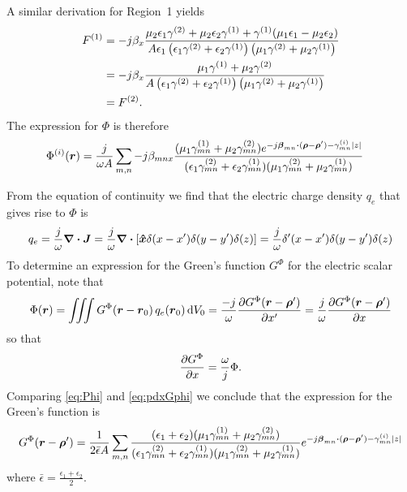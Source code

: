 A similar derivation for Region~1 yields
\begin{align}
  F\one 
  &= -j\beta_x
  \frac{\mu_2\epsilon_1\gamma\two+\mu_2\epsilon_2\gamma\one
        + \gamma\one (\mu_1\epsilon_1 - \mu_2\epsilon_2)}%
  {A\epsilon_1
    \left(\epsilon_1\gamma\two+\epsilon_2\gamma\one\right)
    \left(\mu_1\gamma\two+\mu_2\gamma\one\right) }  \nonumber \\
  &= -j\beta_x
  \frac{\mu_1\gamma\one + \mu_2\gamma\two}%
  {A
    \left(\epsilon_1\gamma\two+\epsilon_2\gamma\one\right)
    \left(\mu_1\gamma\two+\mu_2\gamma\one\right) }  \nonumber \\
  &= F\two.
\end{align}
The expression for $\Phi$ is therefore
\begin{align}
  \label{eq:Phi}
  \Phi\eye(\r) 
  &= 
  \frac{j}{\omega A} \summn
    -j\beta_{mnx} 
  \frac{(\mu_1\gamma\one_{mn} + \mu_2\gamma\two_{mn})
     e^{-j\vecbeta_{mn} \bdot (\vecrho-\vecrho') - \gamma\eye_{mn} \abs{z}} }%
  {    (\epsilon_1\gamma\two_{mn}+\epsilon_2\gamma\one_{mn})
    (\mu_1\gamma\two_{mn}+\mu_2\gamma\one_{mn}) }
\end{align}

From the equation of continuity we find that the electric charge
density $q_e$ that gives rise to $\Phi$ is
\begin{equation}
  q_e = \frac{j}{\omega} \boldsymbol{\nabla} \boldsymbol{\cdot} \boldsymbol{J} =
  \frac{j}{\omega} \boldsymbol{\nabla} \boldsymbol{\cdot} [\boldsymbol{\hat{x}}
  \delta(x-x')\delta(y-y')\delta(z)] 
  = \frac{j}{\omega} \delta'(x-x') \delta(y-y') \delta(z)
\end{equation}
To determine an expression for the Green's function $G^\Phi$ for the
electric scalar potential, note that 
\begin{equation}
  \Phi(\boldsymbol{r}) = \iiint G^\Phi(\boldsymbol{r}-\boldsymbol{r}_0) \, q_e(\boldsymbol{r}_0) \, \text{d} V_0
  = \frac{-j}{\omega} \frac{\partial G^\Phi(\boldsymbol{r}-\boldsymbol{\rho}')}{\partial x'}
  = \frac{j}{\omega}  \frac{\partial G^\Phi(\boldsymbol{r}-\boldsymbol{\rho}')}{\partial x}
\end{equation}
so that 
\begin{equation}
  \label{eq:pdxGphi}
  \frac{\partial G^\Phi}{\partial x} = \frac{\omega}{j} \Phi.
\end{equation}
Comparing \eqref{eq:Phi} and \eqref{eq:pdxGphi} we conclude that the
expression for the Green's function is
\begin{equation}
  G^\Phi(\r-\vecrho') = 
  \frac{1}{2\bar{\epsilon}A} \summn
  \frac{(\epsilon_1+\epsilon_2)(\mu_1\gamma\one_{mn} + \mu_2\gamma\two_{mn})}%
  {(\epsilon_1\gamma\two_{mn}+\epsilon_2\gamma\one_{mn})
    (\mu_1\gamma\two_{mn}+\mu_2\gamma\one_{mn}) }
  e^{-j\vecbeta_{mn} \bdot (\vecrho-\vecrho') - \gamma\eye_{mn} \abs{z}}
\end{equation}
where
$\displaystyle  \bar{\epsilon}= \frac{\epsilon_1+\epsilon_2}{2}$.


